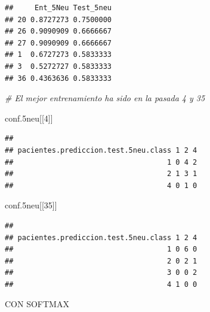 \documentclass[]{article}
\newenvironment{Shaded}{\begin{snugshade}}{\end{snugshade}}
\newcommand{\CommentTok}[1]{\textcolor[rgb]{0.56,0.35,0.01}{\textit{#1}}}
\newcommand{\DecValTok}[1]{\textcolor[rgb]{0.00,0.00,0.81}{#1}}
\newcommand{\FloatTok}[1]{\textcolor[rgb]{0.00,0.00,0.81}{#1}}
\newcommand{\NormalTok}[1]{#1}
\begin{document}
\begin{verbatim}
##     Ent_5Neu Test_5neu
## 20 0.8727273 0.7500000
## 26 0.9090909 0.6666667
## 27 0.9090909 0.6666667
## 1  0.6727273 0.5833333
## 3  0.5272727 0.5833333
## 36 0.4363636 0.5833333
\end{verbatim}

\begin{Shaded}
\begin{Highlighting}[]
\CommentTok{# El mejor entrenamiento ha sido en la pasada 4 y 35}

\NormalTok{conf}\FloatTok{.5}\NormalTok{neu[[}\DecValTok{4}\NormalTok{]]}
\end{Highlighting}
\end{Shaded}

\begin{verbatim}
##                                     
## pacientes.prediccion.test.5neu.class 1 2 4
##                                    1 0 4 2
##                                    2 1 3 1
##                                    4 0 1 0
\end{verbatim}

\begin{Shaded}
\begin{Highlighting}[]
\NormalTok{conf}\FloatTok{.5}\NormalTok{neu[[}\DecValTok{35}\NormalTok{]]}
\end{Highlighting}
\end{Shaded}

\begin{verbatim}
##                                     
## pacientes.prediccion.test.5neu.class 1 2 4
##                                    1 0 6 0
##                                    2 0 2 1
##                                    3 0 0 2
##                                    4 1 0 0
\end{verbatim}

CON SOFTMAX
\end{document}
